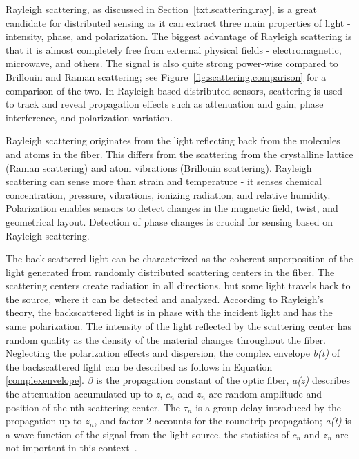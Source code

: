 Rayleigh scattering, as discussed in Section~\ref{txt.scattering.ray}, is a great candidate for distributed sensing as it can extract three main properties of light - intensity, phase, and polarization. The biggest advantage of Rayleigh scattering is that it is almost completely free from external physical fields - electromagnetic, microwave, and others. The signal is also quite strong power-wise compared to Brillouin and Raman scattering; see Figure~\ref{fig:scattering.comparison} for a comparison of the two. In Rayleigh-based distributed sensors, scattering is used to track and reveal propagation effects such as attenuation and gain, phase interference, and polarization variation. 

Rayleigh scattering originates from the light reflecting back from the molecules and atoms in the fiber. This differs from the scattering from the crystalline lattice (Raman scattering) and atom vibrations (Brillouin scattering). Rayleigh scattering can sense more than strain and temperature - it senses chemical concentration, pressure, vibrations, ionizing radiation, and relative humidity. Polarization enables sensors to detect changes in the magnetic field, twist, and geometrical layout. Detection of phase changes is crucial for sensing based on Rayleigh scattering. 

The back-scattered light can be characterized as the coherent superposition of the light generated from randomly distributed scattering centers in the fiber. The scattering centers create radiation in all directions, but some light travels back to the source, where it can be detected and analyzed. According to Rayleigh's theory, the backscattered light is in phase with the incident light and has the same polarization. The intensity of the light reflected by the scattering center has random quality as the density of the material changes throughout the fiber. Neglecting the polarization effects and dispersion, the complex envelope \textit{b(t)} of the backscattered light can be described as follows in Equation \ref{complexenvelope}. $\beta$ is the propagation constant of the optic fiber, \textit{a(z)} describes the attenuation accumulated up to \textit{z}, \textit{$c_n$} and \textit{$z_n$} are random amplitude and position of the nth scattering center. The \textit{$\tau_n$} is a group delay introduced by the propagation up to \textit{$z_n$}, and factor 2 accounts for the roundtrip propagation; \textit{a(t)} is a wave function of the signal from the light source, the statistics of \textit{$c_n$} and \textit{$z_n$} are not important in this context~\cite{distributedrayleigh}.


